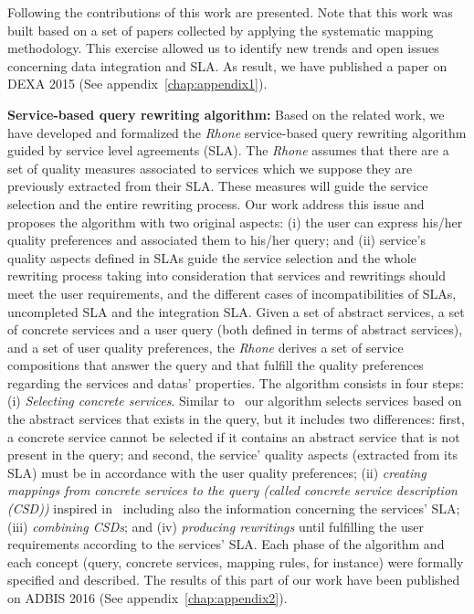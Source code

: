 Following the contributions of this work are presented. Note that this work was built based on a set of papers collected by applying the systematic mapping methodology. This exercise allowed us to identify new trends and open issues concerning data integration and SLA. As result, we have published a paper on DEXA 2015 (See appendix~\ref{chap:appendix1}).

	
\bigskip
\noindent \textbf{Service-based query rewriting algorithm:}
Based on the related work, we have developed and formalized the \textit{Rhone} service-based query rewriting algorithm guided by service level agreements (SLA). The \textit{Rhone} assumes that there are a set of quality measures associated to services which we suppose they are previously extracted from their SLA. These measures will guide the service selection and the entire rewriting process.  Our work address this issue and proposes the algorithm with two original aspects: (i) the user can express his/her quality preferences and associated them to his/her query; and (ii) service's quality aspects defined in SLAs guide the service selection and the whole rewriting process taking into consideration that services and rewritings should meet the user requirements, and the different cases of incompatibilities of SLAs, uncompleted SLA and the integration SLA. 
Given a set of abstract services, a set of concrete services and a user query (both defined in terms of abstract services), and a set of user quality preferences, the \textit{Rhone} derives a set of service compositions that answer the query and that fulfill the quality preferences regarding the services and datas' properties. The algorithm consists in four steps: (i) \textit{Selecting concrete services}. Similar to~\cite{Levy:1996,Pottinger:2001} our algorithm selects services based on the abstract services that exists in the query, but it includes two differences: first, a concrete service cannot be selected if it contains an abstract service that is not present in the query; and second, the service' quality aspects (extracted from its SLA) must be in accordance with the user quality preferences; (ii) \textit{creating mappings from concrete services to the query (called concrete service description (CSD))} inspired in~\cite{Pottinger:2001} including also the information concerning the services' SLA; (iii) \textit{combining CSDs}; and (iv) \textit{producing rewritings} until fulfilling the user requirements according to the services' SLA. Each phase of the algorithm and each concept (query, concrete services, mapping rules, for instance) were formally specified and described. The results of this part of our work have been published on ADBIS 2016 (See appendix~\ref{chap:appendix2}).


